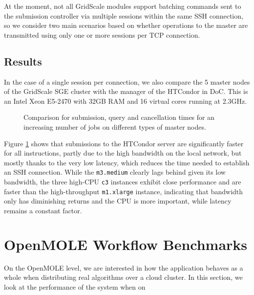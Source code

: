 At the moment, not all GridScale modules support batching commands sent to the submission controller via multiple sessions within the same SSH connection, so we consider two main scenarios based on whether operations to the master are transmitted using only one or more sessions per TCP connection.

\subsection{Results}

In the case of a single session per connection, we also compare the 5 master nodes of the GridScale SGE cluster with the manager of the HTCondor in DoC. This is an Intel Xeon E5-2470 with 32GB RAM and 16 virtual cores running at 2.3GHz. 

\begin{figure}[H]
	\centering
	\endminipage \vfill
	\endminipage \hfill
	\endminipage \hfill
	\caption{Comparison for submission, query and cancellation times for an increasing number of jobs on different types of master nodes.}
	\label{SingleSession}
\end{figure}

Figure \ref{SingleSession} shows that submissions to the HTCondor server are significantly faster for all instructions, partly due to the high bandwidth on the local network, but mostly thanks to the very low latency, which reduces the time needed to establish an SSH connection. While the \verb|m3.medium| clearly lags behind given its low bandwidth, the three high-CPU \verb|c3| instances exhibit close performance and are faster than the high-throughput \verb|m1.xlarge| instance, indicating that bandwidth only has diminishing returns and the CPU is more important, while latency remains a constant factor.

\section{OpenMOLE Workflow Benchmarks}

On the OpenMOLE level, we are interested in how the application behaves as a whole when distributing real algorithms over a cloud cluster. In this section, we look at the performance of the system when on

